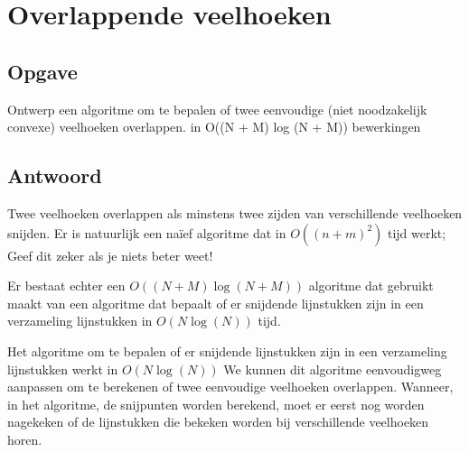 \documentclass[examenvragen.tex]{subfiles}
\begin{document}
\section{Overlappende veelhoeken}
\subsection{Opgave}
Ontwerp een algoritme om te bepalen of twee eenvoudige (niet noodzakelijk convexe) veelhoeken overlappen.
in O((N + M) log (N + M)) bewerkingen 

\subsection{Antwoord}
Twee veelhoeken overlappen als minstens twee zijden van verschillende veelhoeken snijden. Er is natuurlijk een na\"ief algoritme dat in $O((n+m)^2)$ tijd werkt; Geef dit zeker als je niets beter weet!

Er bestaat echter een $O((N+M)\log(N+M))$ algoritme dat gebruikt maakt van een algoritme dat bepaalt of er snijdende lijnstukken zijn in een verzameling lijnstukken in $O(N\log(N))$ tijd.

Het algoritme om te bepalen of er snijdende lijnstukken zijn in een verzameling lijnstukken werkt in $O(N\log(N))$ We kunnen dit algoritme eenvoudigweg aanpassen om te berekenen of twee eenvoudige veelhoeken overlappen. Wanneer, in het algoritme, de snijpunten worden berekend, moet er eerst nog worden nagekeken of de lijnstukken die bekeken worden bij verschillende veelhoeken horen. 
\end{document}
